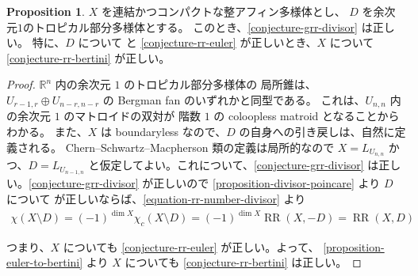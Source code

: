\documentclass[a4paper,dvipdfmx,reqno,12pt]{amsart}
\theoremstyle{definition}
\newtheorem{proposition}[theorem]{Proposition}
\newcommand{\opn}[1]{\operatorname{#1}}
\numberwithin{equation}{section}
\begin{document}
\begin{proposition}
$X$ を連結かつコンパクトな整アフィン多様体とし、
$D$ を余次元$1$のトロピカル部分多様体とする。
このとき、\cref{conjecture-grr-divisor} は正しい。
特に、$D$ について\cite[Conjecture 6.13]{demedrano2023chern}
と \cref{conjecture-rr-euler} 
が正しいとき、$X$ について \cref{conjecture-rr-bertini}
が正しい。
\end{proposition}
\begin{proof}
$\mathbb{R}^n$ 内の余次元 $1$ のトロピカル部分多様体の
局所錐は、$U_{r-1,r}\oplus U_{n-r,n-r}$ の
Bergman fan のいずれかと同型である。
これは、$U_{n,n}$ 内の余次元 $1$ のマトロイドの双対が
階数 $1$ の coloopless matroid となることからわかる。
また、$X$ は boundaryless なので、$D$
の自身への引き戻しは、自然に定義される。
Chern--Schwartz--Macpherson 類の定義は局所的なので
$X=L_{U_{n,n}}$ かつ、$D=L_{U_{n-1,n}}$ 
と仮定してよい。これについて、\cref{conjecture-grr-divisor}
は正しい。\cref{conjecture-grr-divisor} が正しいので
\cref{proposition-divisor-poincare} より
$D$ について \cite[Conjecture 6.13]{demedrano2023chern}
が正しいならば、\eqref{equation-rr-number-divisor}
より
\begin{align}
\chi(X\setminus D)=(-1)^{\dim X}\chi_c(X\setminus D)
=(-1)^{\dim X}\opn{RR}(X,-D)
=\opn{RR}(X,D)
\end{align}

つまり、$X$ についても \cref{conjecture-rr-euler}
が正しい。よって、
\cref{proposition-euler-to-bertini} より
$X$ についても \cref{conjecture-rr-bertini} は正しい。

\end{proof}





\end{document}
